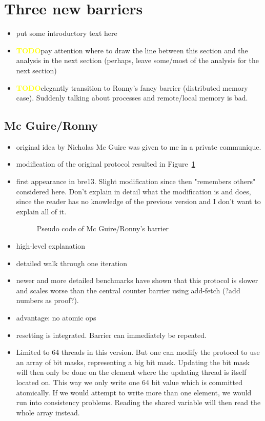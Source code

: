 \documentclass[a4paper, 10pt]{article}
\def \todo{\textbf{\textcolor{yellow}{TODO}}}
\begin{document}
\section{Three new barriers}
\begin{itemize}
	\item put some introductory text here
	\item \todo pay attention where to draw the line between this section and the analysis in the next section (perhaps, leave some/most of the analysis for the next section)
	\item \todo elegantly transition to Ronny's fancy barrier (distributed memory case). Suddenly talking about processes and remote/local memory is bad.
\end{itemize}
\subsection{Mc Guire/Ronny}
\begin{itemize}
	\item original idea by Nicholas Mc Guire was given to me in a private communique.
	\item modification of the original protocol resulted in Figure~\ref{fig:nmg-ronny-with-reset}
	\item first appearance in bre13\cite{bre13}. Slight modification since then "remembers others" considered here. Don't explain in detail what the modification is and does, since the reader has no knowledge of the previous version and I don't want to explain all of it.
		\begin{figure}[htbp]
			\centering
			
			\caption{Pseudo code of Mc Guire/Ronny's barrier}
			\label{fig:nmg-ronny-with-reset}
		\end{figure}
	\item high-level explanation
	\item detailed walk through one iteration
	\item newer and more detailed benchmarks have shown that this protocol is slower and scales worse than the central counter barrier using add-fetch (?add numbers as proof?).
	\item advantage: no atomic ops
	\item resetting is integrated. Barrier can immediately be repeated.
	\item Limited to 64 threads in this version. But one can modify the protocol to use an array of bit masks, representing a big bit mask. Updating the bit mask will then only be done on the element where the updating thread is itself located on. This way we only write one 64 bit value which is committed atomically. If we would attempt to write more than one element, we would run into consistency problems. Reading the shared variable will then read the whole array instead.
\end{itemize}
\end{document}
